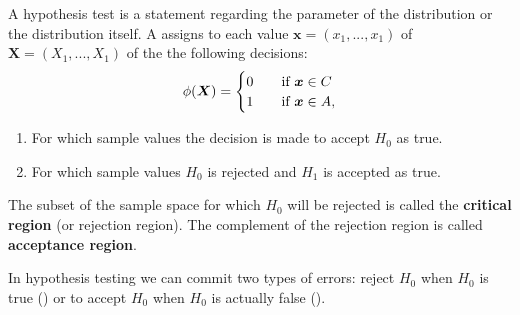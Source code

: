 \begin{definition}\label{hypothesis test}
    A hypothesis test is a statement regarding the parameter of the distribution or the distribution itself. A  assigns to each value $\boldsymbol{x} = (x_1,...,x_1)$ of $\boldsymbol{X} = (X_1,...,X_1)$ of the the following decisions:
    \begin{equation}
        \phi(\boldsymbol{X}) = 
        \begin{cases}
            0 \quad& \text{if }  \boldsymbol{x} \in C \\
            1 & \text{if }  \boldsymbol{x} \in A,
    \end{cases}
    \end{equation}
    
    \begin{enumerate}[i]
        \item For which sample values the decision is made to accept $H_0$ as true.
        \item For which sample values $H_0$ is rejected and $H_1$ is accepted as true. 
    \end{enumerate}
\end{definition}
The subset of the sample space for which $H_0$ will be rejected is called the \textbf{critical region} (or rejection region). The complement of the rejection region is called \textbf{acceptance region}.


In hypothesis testing we can commit two types of errors: reject $H_0$ when $H_0$ is true () or to accept $H_0$ when $H_0$ is actually false ().

